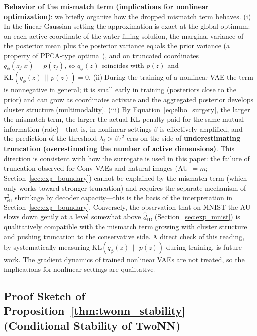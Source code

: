\documentclass[make,article,submit,pdftex,moreauthors]{Definitions/mdpi}
\newcommand{\hatdID}{\hat{d}_{\mathrm{ID}}}
\begin{document}
\textbf{Behavior of the mismatch term (implications for nonlinear
optimization)}:
we briefly organize how the dropped mismatch term behaves.
(i) In the linear-Gaussian setting the approximation is exact at the global
optimum: on each active coordinate of the water-filling solution, the
marginal variance of the posterior mean plus the posterior variance equals
the prior variance (a property of PPCA-type
optima~\cite{tippingbishop1999ppca,lucas2019elbo}), and on truncated
coordinates $q_\phi(z_j|x) = p(z_j)$, so $q_\phi(z)$ coincides with $p(z)$
and $\mathrm{KL}(q_\phi(z)\,\|\,p(z)) = 0$.
(ii) During the training of a nonlinear VAE the term is nonnegative in
general; it is small early in training (posteriors close to the prior) and
can grow as coordinates activate and the aggregated posterior develops
cluster structure (multimodality).
(iii) By Equation~\eqref{eq:elbo_surgery}, the larger the mismatch term,
the larger the actual KL penalty paid for the same mutual information
(rate)---that is, in nonlinear settings $\beta$ is effectively amplified,
and the prediction of the threshold $\lambda_j > \beta\tau^2$ errs on the
side of \textbf{underestimating truncation (overestimating the number of
active dimensions)}.
This direction is consistent with how the surrogate is used in this paper:
the failure of truncation observed for Conv-VAEs and natural images
(AU $= m$; Section~\ref{sec:exp_boundary}) cannot be explained by the
mismatch term (which only works toward stronger truncation) and requires
the separate mechanism of $\tau^2_{\mathrm{eff}}$ shrinkage by decoder
capacity---this is the basis of the interpretation in
Section~\ref{sec:exp_boundary}.
Conversely, the observation that on MNIST the AU slows down gently at a
level somewhat above $\hatdID$ (Section~\ref{sec:exp_mnist}) is
qualitatively compatible with the mismatch term growing with cluster
structure and pushing truncation to the conservative side.
A direct check of this reading, by systematically measuring
$\mathrm{KL}(q_\phi(z)\,\|\,p(z))$ during training, is future work.
The gradient dynamics of trained nonlinear VAEs are not treated, so the
implications for nonlinear settings are qualitative.

\subsection[\appendixname~\thesubsection]{Proof Sketch of Proposition~\ref{thm:twonn_stability} (Conditional Stability of TwoNN)}
\end{document}
